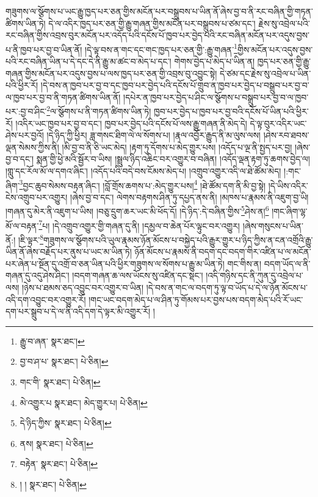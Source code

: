 གཟུགས་ལ་སྩོགས་པ་ཡང་རྒྱུ་ཁྱད་པར་ཅན་གྱིས་མངོན་པར་བསྒྲུབས་པ་ཡིན་ནོ་ཞེས་བྱ་བ་ནི་རང་བཞིན་གྱི་གཏན་ཚིགས་ཡིན་ཏེ། དེ་ལ་འདིར་ཁྱད་པར་ཅན་གྱི་རྒྱུ་གཞན་གྱིས་མངོན་པར་བསྒྲུབས་པ་ཙམ་དང་། རྗེས་སུ་འབྲེལ་པའི་རང་བཞིན་གྱིས་འབྲས་བུར་མངོན་པར་འདོད་པའི་དངོས་པོ་ཁྱབ་པར་བྱེད་པའི་རང་བཞིན་མངོན་པར་འདུས་བྱས་པ་ནི་ཁྱབ་པར་བྱ་བ་ཡིན་ནོ། །དེ་ལྟ་བས་ན་གང་དང་གང་ཁྱད་པར་ཅན་གྱི་:རྒྱུ་གཞན་\footnote{རྒྱུ་བ་ཞན་  སྣར་ཐང་། }གྱིས་མངོན་པར་འདུས་བྱས་པའི་རང་བཞིན་ཡིན་པ་དེ་དང་དེ་ནི་རྒྱུ་མ་ཚང་བ་མེད་པ་དང་། གེགས་བྱེད་པ་མེད་པ་ཡིན་ན། ཁྱད་པར་ཅན་གྱི་རྒྱུ་གཞན་གྱིས་མངོན་པར་འདུས་བྱས་པ་ལས་ཁྱད་པར་ཅན་གྱི་འབྲས་བུ་འབྱུང་སྟེ། དེ་ཙམ་དང་རྗེས་སུ་འབྲེལ་པ་ཡིན་པའི་ཕྱིར་རོ། །དེ་བས་ན་ཁྱབ་པར་བྱ་བ་དང་ཁྱབ་པར་བྱེད་པའི་དངོས་པོ་གྲུབ་ན་ཁྱབ་པར་བྱེད་པ་བསྒྲུབ་པར་བྱ་བ་ལ་ཁྱབ་པར་བྱ་བ་ནི་གཏན་ཚིགས་ཡིན་ནོ། །དཔེར་ན་ཁྱབ་པར་བྱེད་པ་ཤིང་ལ་སྩོགས་པ་བསྒྲུབ་པར་བྱ་བ་ལ་ཁྱབ་པར་:བྱ་བ་ཤིང་\footnote{བྱ་བ་ཤ་པ་  སྣར་ཐང་།  པེ་ཅིན། }ལ་སྩོགས་པ་ནི་གཏན་ཚིགས་ཡིན་ཏེ། ཁྱབ་པར་བྱེད་པ་ཁྱབ་པར་བྱ་བའི་དངོས་པོ་ཡིན་པའི་ཕྱིར་རོ། །འདིར་ཡང་ཁྱབ་པར་བྱ་བ་དང་། ཁྱབ་པར་བྱེད་པའི་དངོས་པོ་ལས་རྒྱུ་གཞན་ནི་མེད་དེ། དེ་ལྟ་བུར་འདིར་ཡང་ཤེས་པར་བྱའོ། །དེ་ཉིད་ཀྱི་ཕྱིར། ཟླ་གསང་ཐིག་ལེ་ལ་སོགས་པ། །རྣལ་འབྱོར་རྒྱུད་ནི་མ་ལུས་ལས། །ཤེས་རབ་ཐབས་ལྡན་སེམས་ཀྱིས་ནི། །མི་བྱ་བ་ནི་ཅི་ཡང་མེད། །རྟག་ཏུ་དོགས་པ་མེད་གྱུར་པས། །འདོད་པ་ལྔ་ནི་སྤྱད་པར་བྱ། །ཞེས་བྱ་བ་དང་། སྨན་གྱི་ཕྱེ་མའི་སྦྱོར་བ་ཡིས། །སྦྲུལ་ཉིད་འཆིང་བར་འགྱུར་བ་བཞིན། །འདོད་ལྡན་རྟག་ཏུ་ཆགས་བྱེད་ལ། །གླུ་དང་རོལ་མོ་ལ་དགའ་ཞིང་། །འདོད་པའི་བདེ་བས་ངོམས་མེད་པ། །འགྲུབ་འགྱུར་འདི་ལ་ཐེ་ཚོམ་མེད། །:གང་ཞིག་\footnote{གང་གི་  སྣར་ཐང་།  པེ་ཅིན། }བྱང་ཆུབ་སེམས་བརྟན་ཞིང་། །བློ་གྲོས་ཆགས་པ་:མེད་གྱུར་པས།\footnote{མེ་འགྱུར་པ  སྣར་ཐང་། མེད་གྱུར་པ།  པེ་ཅིན། } །ཐེ་ཚོམ་དག་ནི་མི་བྱ་སྟེ། །དེ་ཡིས་འདིར་ངེས་འགྲུབ་པར་འགྱུར། །ཞེས་བྱ་བ་དང་། ལེགས་བརྟགས་ཤིན་ཏུ་དཔྱད་ནས་ནི། །མཁས་པ་རྣམས་ནི་འཇུག་བྱ་ཡི། །གཞན་དུ་མེར་ནི་འཇུག་པ་ཡིས། །བཅུ་དྲུག་ཆར་ཡང་མི་ཕོད་དོ། །དེ་ཉིད་:དེ་བཞིན་གྱིས་\footnote{དེ་ཉིད་ཀྱིས་  སྣར་ཐང་།  པེ་ཅིན། }ཤེས་ན།\footnote{ནས།  སྣར་ཐང་།  པེ་ཅིན། } །གང་ཞིག་ལྷ་མོ་ལ་བརྟན་\footnote{བརྟེན་  སྣར་ཐང་།  པེ་ཅིན། }པ། །དེ་འགྲུབ་འགྱུར་གྱི་གཞན་དུ་ནི། །དམྱལ་བ་ཆེན་པོར་ལྟུང་བར་འགྱུར། །ཞེས་གསུངས་པ་ཡིན་ནོ:། །ཇི་ལྟར་\footnote{། །  སྣར་ཐང་།  པེ་ཅིན། }གཟུགས་ལ་སྩོགས་པའི་ཡུལ་རྣམས་ཉོན་མོངས་པ་བསྐྱེད་པའི་རྒྱུར་གྱུར་པ་ཉིད་ཀྱིས་ན་ངན་འགྲོའི་རྒྱུ་ཡིན་ནོ་ཞེས་བརྗོད་པར་ནུས་པ་ཡང་མ་ཡིན་ཏེ། ཉོན་མོངས་པ་རྣམས་ནི་བདག་དང་བདག་གིར་འཛིན་པ་ལ་མངོན་པར་ཞེན་པ་སྔོན་དུ་འགྲོ་བ་ཅན་ཡིན་པའི་ཕྱིར་གཟུགས་ལ་སོགས་པ་རྒྱུ་མ་ཡིན་ཏེ། གང་གིས་ན། བདག་ཡོད་ལ་ནི་གཞན་དུ་འདུ་ཤེས་ཤིང་། །བདག་གཞན་ཆ་ལས་ཡོངས་སུ་འཛིན་དང་སྡང་། །འདི་གཉིས་དང་ནི་ཀུན་དུ་འབྲེལ་པ་ལས། །ཉེས་པ་ཐམས་ཅད་འབྱུང་བར་འགྱུར་བ་ཡིན། །དེ་བས་ན་གང་ལ་བདག་ཏུ་ལྟ་བ་ཡོད་པ་དེ་ལ་ཉོན་མོངས་པ་འདི་དག་འབྱུང་བར་འགྱུར་རོ། །གང་ཡང་བདག་མེད་པ་ལ་ཤིན་ཏུ་གོམས་པར་བྱས་པས་བདག་མེད་པའི་རོ་ཡང་དག་པར་སྒྲུབ་པ་དེ་ལ་ནི་འདི་དག་དེ་ལྟར་མི་འགྱུར་རོ། །
